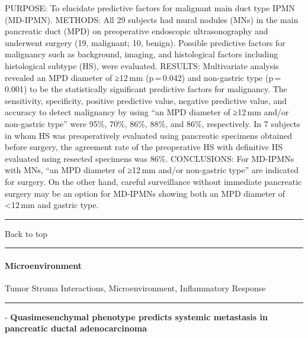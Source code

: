 \documentclass[]{article}
\let\oldparagraph\paragraph
\renewcommand{\paragraph}[1]{\oldparagraph{#1}\mbox{}}
\begin{document}
PURPOSE: To elucidate predictive factors for malignant main duct type
IPMN (MD-IPMN). METHODS: All 29 subjects had mural nodules (MNs) in the
main pancreatic duct (MPD) on preoperative endoscopic ultrasonography
and underwent surgery (19, malignant; 10, benign). Possible predictive
factors for malignancy such as background, imaging, and histological
factors including histological subtype (HS), were evaluated. RESULTS:
Multivariate analysis revealed an MPD diameter of ≥12\,mm (p\,=\,0.042)
and non-gastric type (p\,=\,0.001) to be the statistically significant
predictive factors for malignancy. The sensitivity, specificity,
positive predictive value, negative predictive value, and accuracy to
detect malignancy by using ``an MPD diameter of ≥12\,mm and/or
non-gastric type'' were 95\%, 70\%, 86\%, 88\%, and 86\%, respectively.
In 7 subjects in whom HS was preoperatively evaluated using pancreatic
specimens obtained before surgery, the agreement rate of the
preoperative HS with definitive HS evaluated using resected specimens
was 86\%. CONCLUSIONS: For MD-IPMNs with MNs, ``an MPD diameter of
≥12\,mm and/or non-gastric type'' are indicated for surgery. On the
other hand, careful surveillance without immediate pancreatic surgery
may be an option for MD-IPMNs showing both an MPD diameter of
\textless{}12\,mm and gastric type.

{}

{}

\begin{center}\rule{0.5\linewidth}{\linethickness}\end{center}

Back to top

\begin{center}\rule{0.5\linewidth}{\linethickness}\end{center}

\pagebreak

\hypertarget{microenvironment}{%
\paragraph{Microenvironment}\label{microenvironment}}

Tumor Stroma Interactions, Microenvironment, Inflammatory Response

\begin{center}\rule{0.5\linewidth}{\linethickness}\end{center}

 - \textbf{Quasimesenchymal phenotype predicts systemic metastasis in
pancreatic ductal adenocarcinoma}
\end{document}
